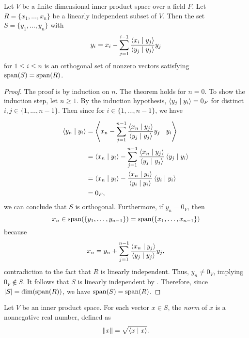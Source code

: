 \begin{theorem}
  Let $V$ be a finite-dimensional inner product space over a field $F$.
  Let $R = \{x_1, \dots, x_n\}$ be a linearly independent subset of $V$.
  Then the set $S = \{y_1, \dots, y_n\}$ with
  \begin{equation*}
    y_i = x_i - \sum_{j=1}^{i-1} \frac{\left\langle x_i \; \middle| \; y_j \right\rangle}{\left\langle y_j \; \middle| \; y_j \right\rangle}y_j
  \end{equation*}
  for $1 \leq i \leq n$ is an orthogonal set of nonzero vectors
  satisfying $\operatorname{span}(S) = \operatorname{span}(R)$.
\end{theorem}
\begin{proof}
  The proof is by induction on $n$.
  The theorem holds for $n = 0$.
  To show the induction step, let $n \geq 1$.
  By the induction hypothesis, $\left\langle y_j \; \middle| \; y_i \right\rangle = 0_F$ for distinct
  $i, j \in \{1, \dots, n - 1\}$.
  Then since for $i \in \{1, \dots, n - 1\}$, we have
  \begin{align*}
    \left\langle y_n \; \middle| \; y_i \right\rangle
    &= \left\langle x_n - \sum_{j=1}^{n-1}
              \frac{\left\langle x_n \; \middle| \; y_j \right\rangle}{\left\langle y_j \; \middle| \; y_j \right\rangle}y_j \; \middle| \; y_i \right\rangle \\
    &= \left\langle x_n \; \middle| \; y_i \right\rangle - \sum_{j=1}^{n-1}
       \frac{\left\langle x_n \; \middle| \; y_j \right\rangle}{\left\langle y_j \; \middle| \; y_j \right\rangle}\left\langle y_j \; \middle| \; y_i \right\rangle \\
    &= \left\langle x_n \; \middle| \; y_i \right\rangle
       - \frac{\left\langle x_n \; \middle| \; y_i \right\rangle}{\left\langle y_i \; \middle| \; y_i \right\rangle}\left\langle y_i \; \middle| \; y_i \right\rangle \\
    &= 0_F,
  \end{align*}
  we can conclude that $S$ is orthogonal.
  Furthermore, if $y_n = 0_V$, then
  \begin{equation*}
    x_n \in \operatorname{span}(\{y_1, \dots, y_{n-1}\}) = \operatorname{span}(\{x_1, \dots, x_{n-1}\})
  \end{equation*}
  because
  \begin{equation*}
    x_n = y_n + \sum_{j=1}^{n-1} \frac{\left\langle x_n \; \middle| \; y_j \right\rangle}{\left\langle y_j \; \middle| \; y_j \right\rangle}y_j,
  \end{equation*}
  contradiction to the fact that $R$ is linearly independent.
  Thus, $y_n \neq 0_V$, implying $0_V \notin S$.
  It follows that $S$ is linearly independent by
  .
  Therefore, since $|S| = \dim(\operatorname{span}(R))$, we have $\operatorname{span}(S) = \operatorname{span}(R)$.
\end{proof}

\begin{definition}
  Let $V$ be an inner product space.
  For each vector $x \in S$, the \emph{norm} of $x$ is a nonnegative real
  number, defined as
  \begin{equation*}
    \left\Vert x \right\Vert = \sqrt{\left\langle x \; \middle| \; x \right\rangle}.
  \end{equation*}
\end{definition}

